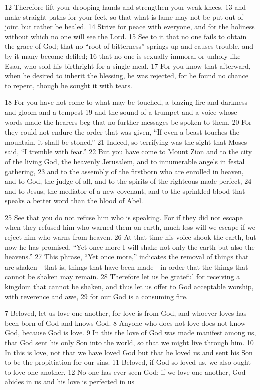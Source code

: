 \begin{bible}
12 Therefore lift your drooping hands and strengthen your weak knees, 13 and make straight paths for your feet, so that what is lame may not be put out of joint but rather be healed. 14 Strive for peace with everyone, and for the holiness without which no one will see the Lord. 15 See to it that no one fails to obtain the grace of God; that no ``root of bitterness'' springs up and causes trouble, and by it many become defiled; 16 that no one is sexually immoral or unholy like Esau, who sold his birthright for a single meal. 17 For you know that afterward, when he desired to inherit the blessing, he was rejected, for he found no chance to repent, though he sought it with tears.

18 For you have not come to what may be touched, a blazing fire and darkness and gloom and a tempest 19 and the sound of a trumpet and a voice whose words made the hearers beg that no further messages be spoken to them. 20 For they could not endure the order that was given, ``If even a beast touches the mountain, it shall be stoned.'' 21 Indeed, so terrifying was the sight that Moses said, ``I tremble with fear.'' 22 But you have come to Mount Zion and to the city of the living God, the heavenly Jerusalem, and to innumerable angels in festal gathering, 23 and to the assembly of the firstborn who are enrolled in heaven, and to God, the judge of all, and to the spirits of the righteous made perfect, 24 and to Jesus, the mediator of a new covenant, and to the sprinkled blood that speaks a better word than the blood of Abel.

25 See that you do not refuse him who is speaking. For if they did not escape when they refused him who warned them on earth, much less will we escape if we reject him who warns from heaven. 26 At that time his voice shook the earth, but now he has promised, ``Yet once more I will shake not only the earth but also the heavens.'' 27 This phrase, ``Yet once more,'' indicates the removal of things that are shaken—that is, things that have been made—in order that the things that cannot be shaken may remain. 28 Therefore let us be grateful for receiving a kingdom that cannot be shaken, and thus let us offer to God acceptable worship, with reverence and awe, 29 for our God is a consuming fire.

7 Beloved, let us love one another, for love is from God, and whoever loves has been born of God and knows God. 8 Anyone who does not love does not know God, because God is love. 9 In this the love of God was made manifest among us, that God sent his only Son into the world, so that we might live through him. 10 In this is love, not that we have loved God but that he loved us and sent his Son to be the propitiation for our sins. 11 Beloved, if God so loved us, we also ought to love one another. 12 No one has ever seen God; if we love one another, God abides in us and his love is perfected in us 
\end{bible}

